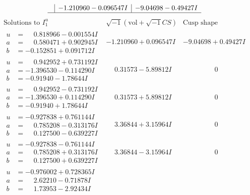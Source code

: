 \documentclass[1p]{elsarticle_modified}
\theoremstyle{definition}
\newcommand{\I}{\sqrt{-1}}
\begin{document}
$$\begin{array}{c|c|c}
 & -1.210960 - 0.096547 I & -9.04698 - 0.49427 I\\
 \hline 
 \end{array}$$\newpage$$\begin{array}{c|c|c}  
\text{Solutions to }I^u_{1}& \I (\text{vol} + \sqrt{-1}CS) & \text{Cusp shape}\\
 \hline 
\begin{aligned}
u &= \phantom{-}0.818966 - 0.001554 I \\
a &= \phantom{-}0.580471 + 0.902945 I \\
b &= -0.152851 + 0.091712 I\end{aligned}
 & -1.210960 + 0.096547 I & -9.04698 + 0.49427 I \\ \hline\begin{aligned}
u &= \phantom{-}0.942952 + 0.731192 I \\
a &= -1.396530 - 0.114290 I \\
b &= -0.91940 - 1.78644 I\end{aligned}
 & \phantom{-}0.31573 - 5.89812 I & \phantom{-0.000000 } 0 \\ \hline\begin{aligned}
u &= \phantom{-}0.942952 - 0.731192 I \\
a &= -1.396530 + 0.114290 I \\
b &= -0.91940 + 1.78644 I\end{aligned}
 & \phantom{-}0.31573 + 5.89812 I & \phantom{-0.000000 } 0 \\ \hline\begin{aligned}
u &= -0.927838 + 0.761144 I \\
a &= \phantom{-}0.785208 - 0.313176 I \\
b &= \phantom{-}0.127500 - 0.639227 I\end{aligned}
 & \phantom{-}3.36844 + 3.15964 I & \phantom{-0.000000 } 0 \\ \hline\begin{aligned}
u &= -0.927838 - 0.761144 I \\
a &= \phantom{-}0.785208 + 0.313176 I \\
b &= \phantom{-}0.127500 + 0.639227 I\end{aligned}
 & \phantom{-}3.36844 - 3.15964 I & \phantom{-0.000000 } 0 \\ \hline\begin{aligned}
u &= -0.976002 + 0.728365 I \\
a &= \phantom{-}2.62210 - 0.71878 I \\
b &= \phantom{-}1.73953 - 2.92434 I\end{aligned}

\end{array}$$
\end{document}
